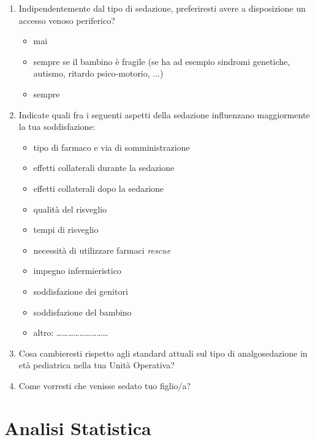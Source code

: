 \begin{enumerate}
           \item Indipendentemente dal tipo di sedazione, preferiresti avere a disposizione un accesso venoso periferico?
           \begin{itemize}
               \item mai
               \item sempre se il bambino è fragile (se ha ad esempio sindromi genetiche, autismo, ritardo psico-motorio, ...)
               \item sempre
           \end{itemize}
\newpage
           \item Indicate quali fra i seguenti aspetti della sedazione influenzano maggiormente la tua soddisfazione:
           \begin{itemize}
                \item tipo di farmaco e via di somministrazione
                \item effetti collaterali durante la sedazione
                \item effetti collaterali dopo la sedazione
                \item qualità del risveglio
                \item tempi di risveglio
                \item necessità di utilizzare farmaci \emph{rescue}
                \item impegno infermieristico
                \item soddisfazione dei genitori
                \item soddisfazione del bambino
                \item altro: ………………………

           \end{itemize}
           \item Cosa cambieresti rispetto agli standard attuali sul tipo di analgosedazione in età pediatrica nella tua Unità Operativa?
           
           \item Come vorresti che venisse sedato tuo figlio/a?
           
           

\end{enumerate}


\section{Analisi Statistica}

